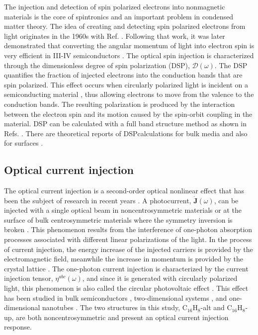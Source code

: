 \documentclass[pss]{wiley2sp} %
\begin{document}
The injection and detection of spin polarized electrons into nonmagnetic
materials is the core of spintronics \cite{vzuticRMP04,fertRMP08} and an
important problem in condensed matter theory. The idea of creating and
detecting spin polarized electrons from light originates in the 1960s with
Ref. \cite{lampelPRL68}. Following that work, it was later demonstrated that
converting the angular momentum of light into electron spin is very efficient
in III-IV semiconductors \cite{dyakonovOO84}. The optical spin injection is
characterized through the dimensionless degree of spin polarization (DSP),
$\boldsymbol{\mathcal{D}}(\omega)$. The DSP quantifies the fraction of
injected electrons into the conduction bands that are spin polarized. This
effect occurs when circularly polarized light is incident on a semiconducting
material \cite{dyakonovOO84}, thus allowing electrons to move from the valence
to the conduction bands. The resulting polarization is produced by the
interaction between the electron spin and its motion caused by the spin-orbit
coupling in the material. DSP can be calculated with a full band structure
method as shown in Refs. \cite{nastosPRB07,cabellosPRB09}. There are
theoretical reports of DSPcalculations for bulk media
\cite{nastosPRB07,cabellosPRB09} and also for surfaces
\cite{mendozaPRB12,arzatePRB14}.


\subsection{Optical current injection}

The optical current injection is a second-order optical nonlinear effect that
has been the subject of research in recent years
\cite{arzatePRB14,bhatPRB05,fraserPRL99,hachePRL97,lamanAPL99}. A
photocurrent, $\mathbf{\dot{J}}(\omega)$, can be injected with a single
optical beam in noncentrosymmetric materials or at the surface of bulk
centrosymmetric materials where the symmetry inversion is broken
\cite{arzatePRB14}. This phenomenon results from the interference of one-photon 
absorption processes associated with different linear polarizations of
the light. In the process of current injection, the energy increase of the
injected carriers is provided by the electromagnetic field, meanwhile the
increase in momentum is provided by the crystal lattice \cite{arzatePRB14}.
The one-photon current injection is characterized by the current injection
tensor, $\eta^{abc}(\omega)$, and since it is generated with circularly
polarized light, this phenomenon is also called the circular photovoltaic
effect \cite{sturmanCRCP92}. This effect has been studied in bulk
semiconductors \cite{hachePRL97,sipePRB00}, two-dimensional systems
\cite{melePRB00,cabellosPRB11}, and one-dimensional nanotubes
\cite{melePRB00}. The two structures in this study, C$_{16}$H$_{8}$-alt and
C$_{16}$H$_{8}$-up, are both noncentrosymmetric and present an optical current
injection response.
\end{document}
